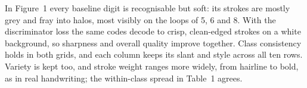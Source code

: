 In Figure~1 every baseline digit is recognisable but soft: its strokes are mostly grey and fray into
halos, most visibly on the loops of 5, 6 and 8. With the discriminator loss the same codes decode to
crisp, clean-edged strokes on a white background, so sharpness and overall quality improve together. Class
consistency holds in both grids, and each column keeps its slant and style across all ten rows.
Variety is kept too, and stroke weight ranges more widely, from hairline to bold, as in real
handwriting; the within-class spread in Table~1 agrees.

